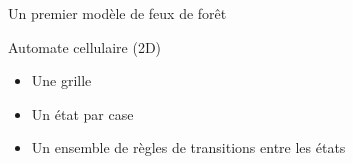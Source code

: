 \documentclass{beamer}
\begin{document}
\begin{frame}{Un premier modèle de feux de forêt \hyperlink{jump}{\beamerbutton{ }} \hypertarget{3}{\beamerbutton{ }}}
    \begin{block}{Automate cellulaire (2D)}
        \begin{itemize}
            \item Une grille
            \item Un état par case
            \item Un ensemble de règles de transitions entre les états
        \end{itemize}
    \end{block}

\end{frame}
\end{document}
